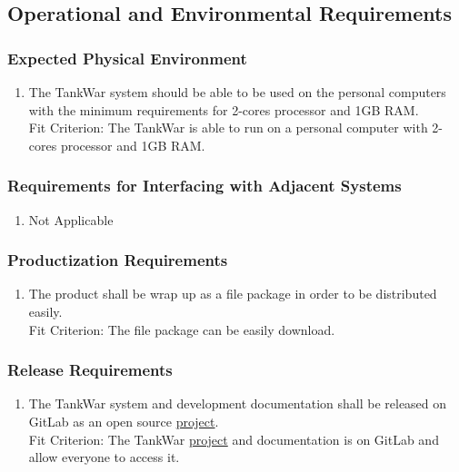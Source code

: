 \documentclass[12pt, titlepage]{article}
\begin{document}

\subsection{Operational and Environmental Requirements}
\label{sub:operational_and_environmental_requirements}

\subsubsection{Expected Physical Environment}
\label{ssub:expected_physical_environment}
\begin{enumerate}[{OE}1. ]
	\item The TankWar system should be able to be used on the personal computers with the minimum requirements for 2-cores processor and 1GB RAM.
	\\
	
	Fit Criterion: The TankWar is able to run on a personal computer with 2-cores processor and 1GB RAM.
\end{enumerate}

\subsubsection{Requirements for Interfacing with Adjacent Systems}
\label{ssub:requirements_for_interfacing_with_adjacent_systems}
\begin{enumerate}[{OE}2. ]
	\item Not Applicable
\end{enumerate}

\subsubsection{Productization Requirements}
\label{ssub:productization_requirements}
\begin{enumerate}[{OE}3. ]
	\item The product shall be wrap up as a file package in order to be distributed easily.
	\\
	
	Fit Criterion: The file package can be easily download.
\end{enumerate}

\subsubsection{Release Requirements}
\label{ssub:release_requirements}
\begin{enumerate}[{OE}4. ]
	\item The TankWar system and development documentation shall be released on GitLab as an open source \underline{project}.
	\\
	
	Fit Criterion: The TankWar \underline{project} and documentation is on GitLab and allow everyone to access it.
\end{enumerate}
\end{document}
